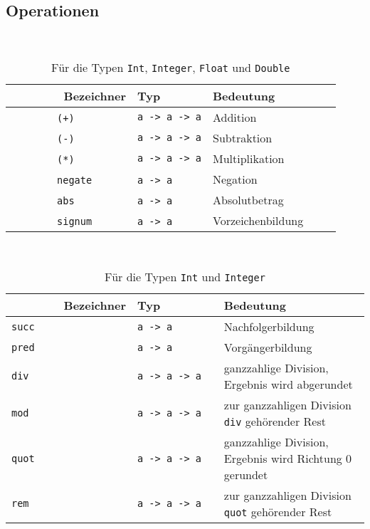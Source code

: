 \documentclass[
  10pt,                   %
  DIV12,
  german,                 %
  oneside,                %
  parskip=half,           %
  headings=normal,        %
  captions=tableheading,  %
]{scrartcl}
\begin{document}
\subsection{Operationen}
\begin{table}[H]
	\centering
    \begin{tabular}{lll} %
        Bezeichner & Typ	& Bedeutung \\ \hline
        \lstinline|(+)|        & \lstinline|a -> a -> a| & Addition          \\ 
        \lstinline|(-)|        & \lstinline|a -> a -> a| & Subtraktion       \\ 
        \lstinline|(*)|        & \lstinline|a -> a -> a| & Multiplikation    \\ 
        \lstinline|negate|     & \lstinline|a -> a|      & Negation        \\ 
        \lstinline|abs|        & \lstinline|a -> a|      & Absolutbetrag     \\ 
        \lstinline|signum|     & \lstinline|a -> a|      & Vorzeichenbildung %
    \end{tabular}	
\caption{Für die Typen \lstinline|Int|, \lstinline|Integer|, \lstinline|Float| und \lstinline|Double|}
\end{table}
\begin{table}[H]
	\centering
    \begin{tabular}{lll} %
        Bezeichner & Typ         & Bedeutung         \\ \hline
		\lstinline|succ| 	& \lstinline|a -> a| & Nachfolgerbildung \\
		\lstinline|pred| 	& \lstinline|a -> a| & Vorgängerbildung\\
		\lstinline|div| 	& \lstinline|a -> a -> a| & ganzzahlige Division, Ergebnis wird abgerundet\\
		\lstinline|mod| 	& \lstinline|a -> a -> a| & zur ganzzahligen Division \lstinline|div| gehörender Rest\\
		\lstinline|quot| 	& \lstinline|a -> a -> a| & ganzzahlige Division, Ergebnis wird Richtung 0 gerundet\\
		\lstinline|rem| 	& \lstinline|a -> a -> a| & zur ganzzahligen Division \lstinline|quot| gehörender Rest %
    \end{tabular}	
\caption{Für die Typen \lstinline|Int| und \lstinline|Integer|}
\end{table}
\end{document}
